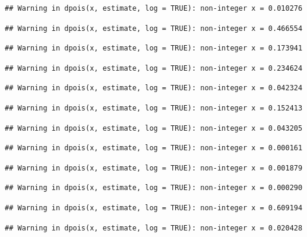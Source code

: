 \documentclass[]{article}
\begin{document}
\begin{verbatim}
## Warning in dpois(x, estimate, log = TRUE): non-integer x = 0.010276
\end{verbatim}

\begin{verbatim}
## Warning in dpois(x, estimate, log = TRUE): non-integer x = 0.466554
\end{verbatim}

\begin{verbatim}
## Warning in dpois(x, estimate, log = TRUE): non-integer x = 0.173941
\end{verbatim}

\begin{verbatim}
## Warning in dpois(x, estimate, log = TRUE): non-integer x = 0.234624
\end{verbatim}

\begin{verbatim}
## Warning in dpois(x, estimate, log = TRUE): non-integer x = 0.042324
\end{verbatim}

\begin{verbatim}
## Warning in dpois(x, estimate, log = TRUE): non-integer x = 0.152413
\end{verbatim}

\begin{verbatim}
## Warning in dpois(x, estimate, log = TRUE): non-integer x = 0.043205
\end{verbatim}

\begin{verbatim}
## Warning in dpois(x, estimate, log = TRUE): non-integer x = 0.000161
\end{verbatim}

\begin{verbatim}
## Warning in dpois(x, estimate, log = TRUE): non-integer x = 0.001879
\end{verbatim}

\begin{verbatim}
## Warning in dpois(x, estimate, log = TRUE): non-integer x = 0.000290
\end{verbatim}

\begin{verbatim}
## Warning in dpois(x, estimate, log = TRUE): non-integer x = 0.609194
\end{verbatim}

\begin{verbatim}
## Warning in dpois(x, estimate, log = TRUE): non-integer x = 0.020428
\end{verbatim}
\end{document}
